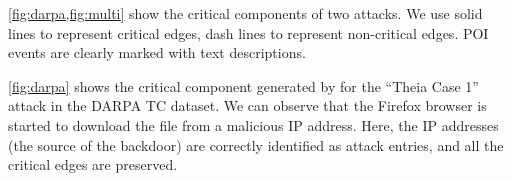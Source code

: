 

\cref{fig:darpa,fig:multi} show the critical components of two attacks. 
We use solid lines to represent critical edges, dash lines to represent non-critical edges. 
POI events are clearly marked with text descriptions.

\cref{fig:darpa} shows the
critical component generated by \tool for the ``Theia Case 1'' attack in the DARPA TC dataset. 
We can observe that the Firefox browser is started to download the file  from a malicious IP address.
Here, the IP addresses (\ie the source of the backdoor) are correctly identified as attack entries, and all the critical edges are preserved.




